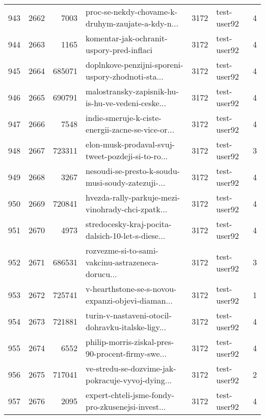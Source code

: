 \begin{tabular}{lrrlrlr}
943  &       2662 &     7003 &  proc-se-nekdy-chovame-k-druhym-zaujate-a-kdy-n... &     3172 &                  test-user92 &               4 \\
944  &       2663 &     1165 &          komentar-jak-ochranit-uspory-pred-inflaci &     3172 &                  test-user92 &               4 \\
945  &       2664 &   685071 &  doplnkove-penzijni-sporeni-uspory-zhodnoti-sta... &     3172 &                  test-user92 &               4 \\
946  &       2665 &   690791 &  malostransky-zapisnik-hu-is-hu-ve-vedeni-ceske... &     3172 &                  test-user92 &               4 \\
947  &       2666 &     7548 &  indie-smeruje-k-ciste-energii-zacne-se-vice-or... &     3172 &                  test-user92 &               4 \\
948  &       2667 &   723311 &  elon-musk-prodaval-svuj-tweet-pozdeji-si-to-ro... &     3172 &                  test-user92 &               3 \\
949  &       2668 &     3267 &  nesoudi-se-presto-k-soudu-musi-soudy-zatezuji-... &     3172 &                  test-user92 &               4 \\
950  &       2669 &   720841 &  hvezda-rally-parkuje-mezi-vinohrady-chci-zpatk... &     3172 &                  test-user92 &               4 \\
951  &       2670 &     4973 &  stredocesky-kraj-pocita-dalsich-10-let-s-diese... &     3172 &                  test-user92 &               4 \\
952  &       2671 &   686531 &  rozvezme-si-to-sami-vakcinu-astrazeneca-dorucu... &     3172 &                  test-user92 &               3 \\
953  &       2672 &   725741 &  v-hearthstone-se-s-novou-expanzi-objevi-diaman... &     3172 &                  test-user92 &               1 \\
954  &       2673 &   721881 &  turin-v-nastaveni-otocil-dohravku-italske-ligy... &     3172 &                  test-user92 &               4 \\
955  &       2674 &     6552 &  philip-morris-ziskal-pres-90-procent-firmy-swe... &     3172 &                  test-user92 &               4 \\
956  &       2675 &   717041 &  ve-stredu-se-dozvime-jak-pokracuje-vyvoj-dying... &     3172 &                  test-user92 &               2 \\
957  &       2676 &     2095 &  expert-chteli-jsme-fondy-pro-zkusenejsi-invest... &     3172 &                  test-user92 &               4 \\

\end{tabular}
